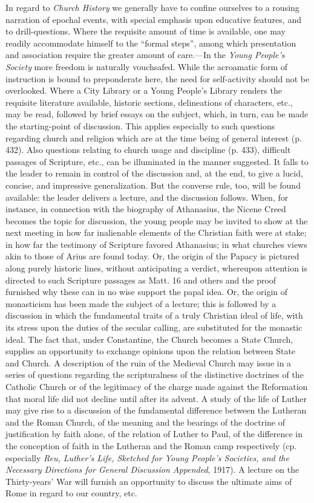 In regard to \emph{Church History} we generally have to confine ourselves to a rousing narration of epochal events, with special emphasis upon educative features, and to drill-questions. Where the requisite amount of time is available, one may readily accommodate himself to the “formal steps”, among which presentation and association require the greater amount of care.—In the \emph{Young People’s Society} more freedom is naturally vouchsafed. While the acroamatic form of instruction is bound to preponderate here, the need for self-activity should not be overlooked. Where a City Library or a Young People’s Library renders the requisite literature available, historic sections, delineations of characters, etc., may be read, followed by brief essays on the subject, which, in turn, can be made the starting-point of discussion. This applies especially to such questions regarding church and religion which are at the time being of general interest (p. 432). Also questions relating to church usage and discipline (p. 433), difficult passages of Scripture, etc., can be illuminated in the manner suggested. It falls to the leader to remain in control of the discussion and, at the end, to give a lucid, concise, and impressive generalization. But the converse rule, too, will be found available: the leader delivers a lecture, and the discussion follows. When, for instance, in connection with the biography of Athanasius, the Nicene Creed becomes the topic for discussion, the young people may be invited to show at the next meeting in how far inalienable elements of the Christian faith were at stake; in how far the testimony of Scripture favored Athanasius; in what churches views akin to those of Arius are found today. Or, the origin of the Papacy is pictured along purely historic lines, without anticipating a verdict, whereupon attention is directed to such Scripture passages as Matt. 16 and others and the proof furnished why these can in no wise support the papal idea. Or, the origin of monasticism has been made the subject of
a lecture; this is followed by a discussion in which the fundamental traits of a truly Christian ideal of life, with its stress upon the duties of the secular calling, are substituted for the monastic ideal. The fact that, under Constantine, the Church becomes a State Church, supplies an opportunity to exchange opinions upon the relation between State and Church. A description of the ruin of the Medieval Church may issue in a series of questions regarding the scripturalness of the distinctive doctrines of the Catholic Church or of the legitimacy of the charge made against the Reformation that moral life did not decline until after its advent. A study of the life of Luther may give rise to a discussion of the fundamental difference between the Lutheran and the Roman Church, of the meaning and the bearings of the doctrine of justification by faith alone, of the relation of Luther to Paul, of the difference in the conception of faith in the Lutheran and the Roman camp respectively (cp. especially \emph{Reu, Luther’s Life, Sketched for Young People’s Societies, and the Necessary Directions for General Discussion Appended}, 1917). A lecture on the Thirty-years’ War will furnish an opportunity to discuss the ultimate aims of Rome in regard to our country, etc.

